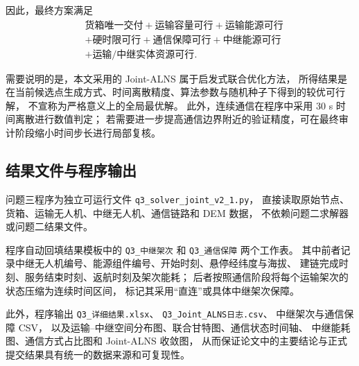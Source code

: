 因此，最终方案满足
\[
\boxed{
	\begin{aligned}
		&\text{货箱唯一交付}
		+\text{运输容量可行}
		+\text{运输能源可行}\\
		&+\text{硬时限可行}
		+\text{通信保障可行}
		+\text{中继能源可行}\\
		&+\text{运输/中继实体资源可行}.
\end{aligned}}
\]

需要说明的是，本文采用的 Joint-ALNS 属于启发式联合优化方法，
所得结果是在当前候选点生成方式、时间离散精度、算法参数与随机种子下得到的较优可行解，
不宣称为严格意义上的全局最优解。
此外，连续通信在程序中采用 30 s 时间离散进行数值判定；
若需要进一步提高通信边界附近的验证精度，可在最终审计阶段缩小时间步长进行局部复核。

\subsection{结果文件与程序输出}

问题三程序为独立可运行文件
\texttt{q3\_solver\_joint\_v2\_1.py}，
直接读取原始节点、货箱、运输无人机、中继无人机、通信链路和 DEM 数据，
不依赖问题二求解器或问题二结果文件。

程序自动回填结果模板中的
\texttt{Q3\_中继架次} 和 \texttt{Q3\_通信保障} 两个工作表。
其中前者记录中继无人机编号、能源组件编号、开始时刻、悬停经纬度与海拔、
建链完成时刻、服务结束时刻、返航时刻及架次能耗；
后者按照通信阶段将每个运输架次的状态压缩为连续时间区间，
标记其采用“直连”或具体中继架次保障。

此外，程序输出
\texttt{Q3\_详细结果.xlsx}、
\texttt{Q3\_Joint\_ALNS日志.csv}、
中继架次与通信保障 CSV，
以及运输--中继空间分布图、联合甘特图、通信状态时间轴、
中继能耗图、通信方式占比图和 Joint-ALNS 收敛图，
从而保证论文中的主要结论与正式提交结果具有统一的数据来源和可复现性。



\newcommand{\QFourUnitNum}{9}
\newcommand{\QFourStrictComponentNum}{1}
\newcommand{\QFourKTwoPartitionNum}{255}
\newcommand{\QFourKThreePartitionNum}{3025}
\newcommand{\QFourTwoRelayMin}{3}
\newcommand{\QFourThreeRelayMin}{4}
\newcommand{\QFourTwoRelayMain}{4}
\newcommand{\QFourThreeRelayMain}{6}
\newcommand{\QFourTwoRelayEnergyMain}{6}
\newcommand{\QFourThreeRelayEnergyMain}{8}
\newcommand{\QFourTwoCopy}{5}
\newcommand{\QFourThreeCopy}{7}
\newcommand{\QFourTwoDeltaEnergy}{2.471}
\newcommand{\QFourThreeDeltaEnergy}{3.918}
\newcommand{\QFourTwoCV}{0.111}
\newcommand{\QFourThreeCV}{0.448}
\newcommand{\QFourTwoZeroTransportNum}{3}
\newcommand{\QFourThreeZeroTransportNum}{1}

